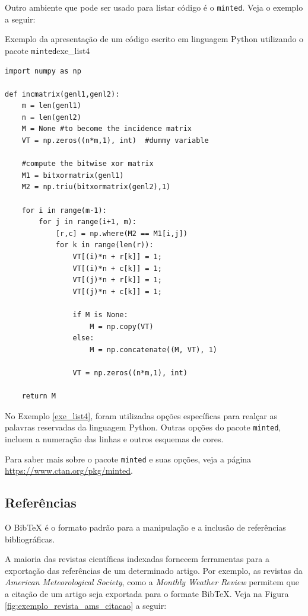 Outro ambiente que pode ser usado para listar código é o {\tt minted}. Veja o exemplo a seguir:

\begin{texexptitled}[breakable,center lower,enhanced,middle=2mm]{Exemplo da apresentação de um código escrito em linguagem Python utilizando o pacote {\tt minted}}{exe_list4}
\begin{verbatim}
import numpy as np
 
def incmatrix(genl1,genl2):
    m = len(genl1)
    n = len(genl2)
    M = None #to become the incidence matrix
    VT = np.zeros((n*m,1), int)  #dummy variable
 
    #compute the bitwise xor matrix
    M1 = bitxormatrix(genl1)
    M2 = np.triu(bitxormatrix(genl2),1) 
 
    for i in range(m-1):
        for j in range(i+1, m):
            [r,c] = np.where(M2 == M1[i,j])
            for k in range(len(r)):
                VT[(i)*n + r[k]] = 1;
                VT[(i)*n + c[k]] = 1;
                VT[(j)*n + r[k]] = 1;
                VT[(j)*n + c[k]] = 1;
 
                if M is None:
                    M = np.copy(VT)
                else:
                    M = np.concatenate((M, VT), 1)
 
                VT = np.zeros((n*m,1), int)
 
    return M
\end{verbatim}
\end{texexptitled}

No Exemplo \ref{exe_list4}, foram utilizadas opções específicas para realçar as palavras reservadas da linguagem Python. Outras opções do pacote {\tt minted}, incluem a numeração das linhas e outros esquemas de cores.

\begin{marker}
  Para saber mais sobre o pacote {\tt minted} e suas opções, veja a página \url{https://www.ctan.org/pkg/minted}.
\end{marker}

\subsection*{Referências}
\label{sec:refs}

O BibTeX é o formato padrão para a manipulação e a inclusão de referências bibliográficas.

A maioria das revistas científicas indexadas fornecem ferramentas para a exportação das referências de um determinado artigo. Por exemplo, as revistas da \textit{American Meteorological Society}, como a \textit{Monthly Weather Review} permitem que a citação de um artigo seja exportada para o formate BibTeX. Veja na Figura \ref{fig:exemplo_revista_ams_citacao} a seguir:

